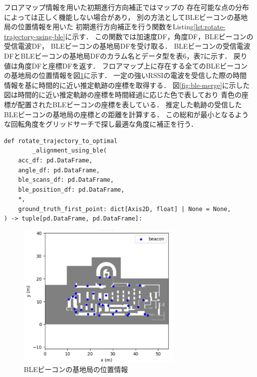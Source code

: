 フロアマップ情報を用いた初期進行方向補正ではマップの
存在可能な点の分布によっては正しく機能しない場合があり，
別の方法としてBLEビーコンの基地局の位置情報を用いた
初期進行方向補正を行う関数をListing\ref{lst:rotate-trajectory-using-ble}に示す．
この関数では加速度DF，角度DF，BLEビーコンの受信電波DF， BLEビーコンの基地局DFを受け取る．
BLEビーコンの受信電波DFとBLEビーコンの基地局DFのカラム名とデータ型を表6，表7に示す．
戻り値は角度DFと座標DFを返す．
フロアマップ上に存在する全てのBLEビーコンの基地局の位置情報を図\ref{fig:ble-beacon-position}に示す．
一定の強いRSSIの電波を受信した際の時間情報を基に時間的に近い推定軌跡の座標を取得する．
図\ref{fig:ble-merge}に示した図は時間的に近い推定軌跡の座標を時間経過に応じた色で表しており
青色の座標が配置されたBLEビーコンの座標を表している．
推定した軌跡の受信したBLEビーコンの基地局の座標との距離を計算する．
この総和が最小となるような回転角度をグリッドサーチで探し最適な角度に補正を行う．

\begin{lstlisting}[caption={BLEビーコンの基地局の位置情報を\\使用した初期進行方向補正}, label=lst:rotate-trajectory-using-ble]
def rotate_trajectory_to_optimal
		_alignment_using_ble(
    acc_df: pd.DataFrame,
    angle_df: pd.DataFrame,
    ble_scans_df: pd.DataFrame,
    ble_position_df: pd.DataFrame,
    *,
    ground_truth_first_point: dict[Axis2D, float] | None = None,
) -> tuple[pd.DataFrame, pd.DataFrame]:
\end{lstlisting}


\begin{figure}[ht]
	\centering
	\includegraphics[width=80mm]{image/ble-beacon-position.jpg}
	\caption{BLEビーコンの基地局の位置情報}    \label{fig:ble-beacon-position}
\end{figure}

